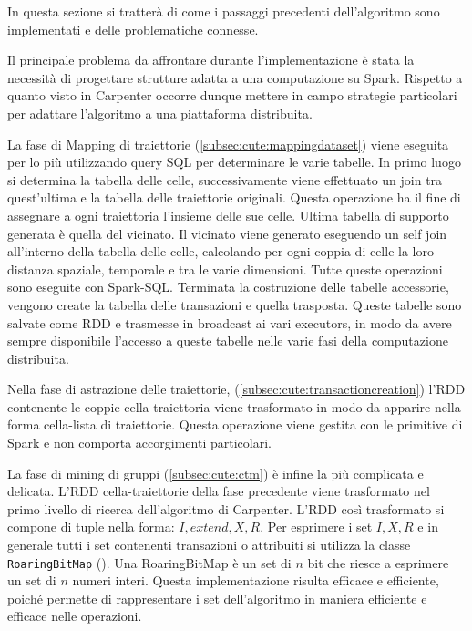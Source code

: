 In questa sezione si tratterà di come i passaggi precedenti dell'algoritmo sono implementati e delle problematiche connesse.

Il principale problema da affrontare durante l'implementazione è stata la necessità di progettare strutture adatta a una computazione su Spark.
Rispetto a quanto visto in Carpenter occorre dunque mettere in campo strategie particolari per adattare l'algoritmo a una piattaforma distribuita.

La fase di Mapping di traiettorie (\cref{subsec:cute:mappingdataset}) viene eseguita per lo più utilizzando query SQL per determinare le varie tabelle.
In primo luogo si determina la tabella delle celle, successivamente viene effettuato un join tra quest'ultima e la tabella delle traiettorie originali.
Questa operazione ha il fine di assegnare a ogni traiettoria l'insieme delle sue celle.
Ultima tabella di supporto generata è quella del vicinato.
Il vicinato viene generato eseguendo un self join all'interno della tabella delle celle, calcolando per ogni coppia di celle la loro distanza spaziale, temporale e tra le varie dimensioni.
Tutte queste operazioni sono eseguite con Spark-SQL.
Terminata la costruzione delle tabelle accessorie, vengono create la tabella delle transazioni e quella trasposta.
Queste tabelle sono salvate come RDD e trasmesse in broadcast ai vari executors, in modo da avere sempre disponibile l'accesso a queste tabelle nelle varie fasi della computazione distribuita.

Nella fase di astrazione delle traiettorie, (\cref{subsec:cute:transactioncreation}) l'RDD contenente le coppie cella-traiettoria viene trasformato in modo da apparire nella forma cella-lista di traiettorie.
Questa operazione viene gestita con le primitive di Spark e non comporta accorgimenti particolari.

La fase di mining di gruppi (\cref{subsec:cute:ctm}) è infine la più complicata e delicata.
L'RDD cella-traiettorie della fase precedente viene trasformato nel primo livello di ricerca dell'algoritmo di Carpenter.
L'RDD così trasformato si compone di tuple nella forma: \(I, extend, X, R\).
Per esprimere i set \(I, X, R\) e in generale tutti i set contenenti transazioni o attribuiti si utilizza la classe \texttt{RoaringBitMap} (\cite{GitHubRo61:online}).
Una RoaringBitMap è un set di \(n\) bit che riesce a esprimere un set di \(n\) numeri interi.
Questa implementazione risulta efficace e efficiente, poiché permette di rappresentare i set dell'algoritmo in maniera efficiente e efficace nelle operazioni.

